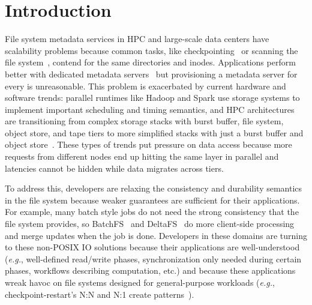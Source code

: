 \section{Introduction}

File system metadata services in HPC and large-scale data centers have
scalability problems because common tasks, like
checkpointing~\cite{bent_plfs_2009} or scanning the file
system~\cite{zheng:pdsw2014-batchfs}, contend for the same directories and
inodes. Applications perform better with dedicated metadata
servers~\cite{sevilla:sc15-mantle, ren:sc2014-indexfs} but provisioning a
metadata server for every 
is unreasonable. This problem is exacerbated by current hardware and software
trends: parallel runtimes like Hadoop and Spark use storage systems to
implement important scheduling and timing semantics, and   HPC architectures are transitioning from complex storage stacks with
burst buffer, file system, object store, and tape tiers to more simplified
stacks with just a burst buffer and object
store~\cite{bent:login16-hpc-trends}. These types of trends put pressure on
data access because more requests from different nodes end up hitting the same
layer in parallel and latencies cannot be hidden while data migrates across
tiers.

To address this, developers are relaxing the consistency and durability
semantics in the file system because weaker guarantees are sufficient for their
applications. For example, many batch style jobs do not need the strong
consistency that the file system provides, so
BatchFS~\cite{zheng:pdsw2014-batchfs} and DeltaFS~\cite{zheng:pdsw2015-deltafs}
do more client-side processing and merge updates when the job is done.
Developers in these domains are turning to these non-POSIX IO solutions because
their applications are well-understood ({\it e.g.}, well-defined read/write
phases, synchronization only needed during certain phases, workflows describing
computation, etc.) and because these applications wreak havoc on file systems
designed for general-purpose workloads ({\it e.g.}, checkpoint-restart's N:N
and N:1 create patterns~\cite{bent_plfs_2009}).

